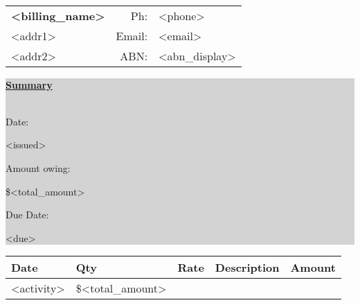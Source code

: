 \documentclass{article}
\begin{document}
\pagestyle{empty}

 \\[20pt]

\begin{table}[!ht]
    \begin{tabular}{lrl}
        {\bf <billing_name>} \hspace{5cm} & Ph:    & <phone> \\
        <addr1>     & Email: & {\color{blue} <email>} \\
        <addr2>    & ABN:   & <abn_display>
    \end{tabular}
\end{table}

\hfill
\colorbox{lightgray}{\parbox{0.3\textwidth}{
    \underline{\bf Summary} \\
    \\
    \parbox{0.15\textwidth}{Date:}         <issued> \\
    \parbox{0.15\textwidth}{Amount owing:} \$<total_amount> \\
    \parbox{0.15\textwidth}{Due Date:}     <due> \\
    }
}

\vspace{1cm}

\begin{table}[!ht]
    \centering
    \begin{tabular}{|l|l|l|l|l|}
        \hline
        \rowcolor{lightgray}
        {\bf Date} \hspace{1cm} & {\bf Qty} \hspace{0.5cm} & {\bf Rate} \hspace{1cm} & {\bf Description} \hspace{5cm} & {\bf Amount} \hspace{0.1cm} \\
        \hline
<activity>\multicolumn{4}{r}{\bf Total:} & \multicolumn{1}{l}{\$<total_amount>}
    \end{tabular}
\end{table}
        

\vspace{5cm}

\end{document}
